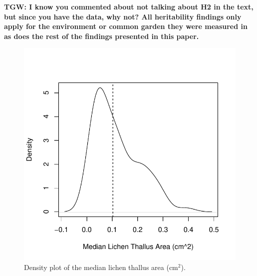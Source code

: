 \documentclass[9pt,twocolumn,twoside,lineno]{pnas-new}
\begin{document}
\textbf{TGW: I know you commented about not talking about H2 in the
  text, but since you have the data, why not?  All heritability
  findings only apply for the environment or common garden they were
  measured in as does the rest of the findings presented in this
  paper.}

 

\setcounter{figure}{0}
\setcounter{table}{0}

\begin{figure}[ht]
\centering
\includegraphics[width=\linewidth]{supplement/xg_size.pdf}
\caption{Density plot of the median lichen thallus area (cm$^2$). }
\label{fig:SI_xg_median}
\end{figure}

 
 
 
 
 
 
 
\end{document}
